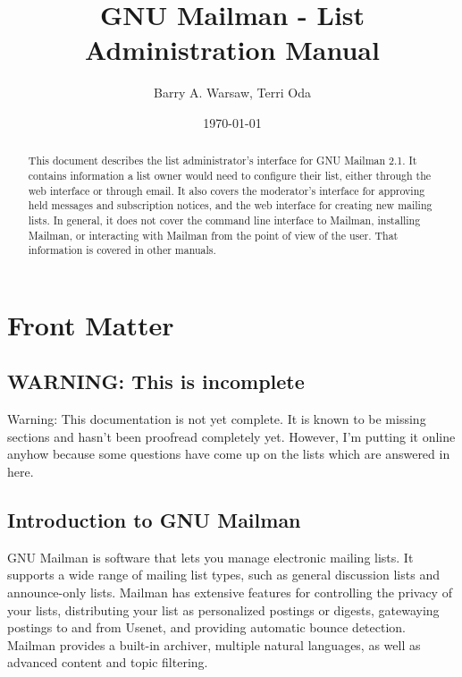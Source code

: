 \documentclass{howto}
\title{GNU Mailman - List Administration Manual}
\author{Barry A. Warsaw, Terri Oda}
\date{\today}			%
\begin{document}
\maketitle

%
\ifhtml
\chapter*{Front Matter\label{front}}
\fi


\begin{abstract}
\noindent
This document describes the list administrator's interface for GNU
Mailman 2.1.  It contains information a list owner would need to
configure their list, either through the web interface or through
email.  It also covers the moderator's interface for approving held
messages and subscription notices, and the web interface for creating
new mailing lists.  In general, it does not cover the command line
interface to Mailman, installing Mailman, or interacting with Mailman
from the point of view of the user.  That information is covered in
other manuals.
\end{abstract}

\tableofcontents

\section{WARNING: This is incomplete}

Warning: This documentation is not yet complete.  It is known to be missing
sections and hasn't been proofread completely yet.  However, I'm putting it
online anyhow because some questions have come up on the lists which are
answered in here.

\section{Introduction to GNU Mailman}

GNU Mailman is software that lets you manage electronic mailing lists.
It supports a wide range of mailing list types, such as general
discussion lists and announce-only lists.  Mailman has extensive
features for controlling the privacy of your lists, distributing your
list as personalized postings or digests, gatewaying postings to and
from Usenet, and providing automatic bounce detection.  Mailman
provides a built-in archiver, multiple natural languages, as well as
advanced content and topic filtering.
\end{document}
